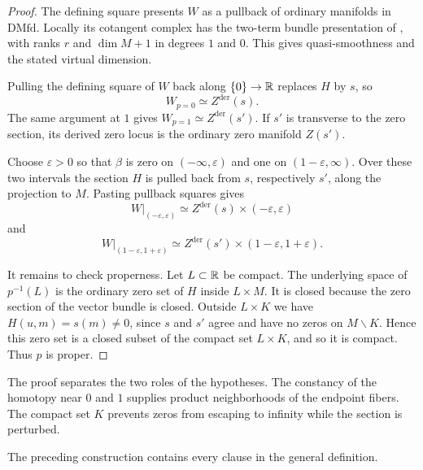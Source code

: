 \begin{proof}
  The defining square presents $W$ as a pullback of ordinary manifolds
  in $\mathrm{DMfd}$. Locally its cotangent complex has the two-term
  bundle presentation of ,
  with ranks $r$ and $\dim M+1$ in degrees $1$ and $0$. This gives
  quasi-smoothness and the stated virtual dimension.

  Pulling the defining square of $W$ back along $\{0\}\to\mathbb{R}$ replaces $H$
  by $s$, so
  \[
    W_{p=0}\simeq Z^{\mathrm{der}}(s).
  \]
  The same argument at $1$ gives $W_{p=1}\simeq Z^{\mathrm{der}}(s')$. If
  $s'$ is transverse to the zero section, its derived zero locus is the
  ordinary zero manifold $Z(s')$.

  Choose $\varepsilon>0$ so that $\beta$ is zero on
  $(-\infty,\varepsilon)$ and one on $(1-\varepsilon,\infty)$. Over these
  two intervals the section $H$ is pulled back from $s$, respectively $s'$,
  along the projection to $M$. Pasting pullback squares gives
  \[
    W|_{(-\varepsilon,\varepsilon)}
    \simeq
    Z^{\mathrm{der}}(s)\times(-\varepsilon,\varepsilon)
  \]
  and
  \[
    W|_{(1-\varepsilon,1+\varepsilon)}
    \simeq
    Z^{\mathrm{der}}(s')\times(1-\varepsilon,1+\varepsilon).
  \]

  It remains to check properness. Let $L\subset\mathbb{R}$ be compact. The
  underlying space of $p^{-1}(L)$ is the ordinary zero set of $H$ inside
  $L\times M$. It is closed because the zero section of the vector bundle
  is closed. Outside $L\times K$ we have $H(u,m)=s(m)\neq0$, since $s$ and
  $s'$ agree and have no zeros on $M\smallsetminus K$. Hence this zero set is a
  closed subset of the compact set $L\times K$, and so it is compact. Thus
  $p$ is proper.
\end{proof}

The proof separates the two roles of the hypotheses. The constancy of the
homotopy near $0$ and $1$ supplies product neighborhoods of the endpoint
fibers. The compact set $K$ prevents zeros from escaping to infinity while
the section is perturbed.

The preceding construction contains every clause in the general definition.


